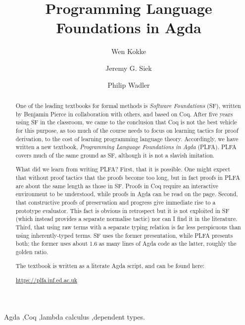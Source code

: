 \documentclass[preprint,authoryear]{elsarticle}
\begin{document}
\title{Programming Language Foundations in Agda}

\author[adr1]{Wen Kokke}
\author[adr2]{Jeremy G. Siek}
\author[adr1]{Philip Wadler}

\address[adr1]{University of Edinburgh, 10 Crichton Street, EH8 9AB, Edinburgh}
\address[adr2]{Indiana University, 700 N Woodlawn Ave, Bloomington, IN 47408, USA}

\begin{abstract}

  One of the leading textbooks for formal methods is \emph{Software
    Foundations} (SF), written by Benjamin Pierce in collaboration
  with others, and based on Coq. After five years using SF in the
  classroom, we came to the conclusion that Coq is not the best
  vehicle for this purpose, as too much of the course needs to focus
  on learning tactics for proof derivation, to the cost of learning
  programming language theory.  Accordingly, we have written a new
  textbook, \emph{Programming Language Foundations in Agda}
  (PLFA). PLFA covers much of the same ground as SF, although it is
  not a slavish imitation.

  What did we learn from writing PLFA? First, that it is possible. One
  might expect that without proof tactics that the proofs become too
  long, but in fact proofs in PLFA are about the same length as those
  in SF. Proofs in Coq require an interactive environment to be
  understood, while proofs in Agda can be read on the page.  Second,
  that constructive proofs of preservation and progress give immediate
  rise to a prototype evaluator. This fact is obvious in retrospect
  but it is not exploited in SF (which instead provides a separate
  normalise tactic) nor can I find it in the literature.  Third, that
  using raw terms with a separate typing relation is far less
  perspicuous than using inherently-typed terms. SF uses the former
  presentation, while PLFA presents both; the former uses about 1.6 as
  many lines of Agda code as the latter, roughly the golden ratio.

  The textbook is written as a literate Agda script, and can be found
  here:
  \begin{center}
    \url{https://plfa.inf.ed.ac.uk}
  \end{center}
\end{abstract}

\begin{keyword}
  Agda \sep Coq \sep lambda calculus \sep dependent types.
\end{keyword}
\end{document}
